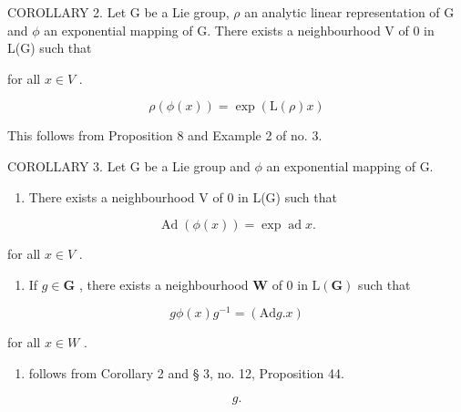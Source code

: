 COROLLARY 2. Let G be a Lie group, \(\rho\) an analytic linear representation of G and \(\phi\) an exponential mapping of G. There exists a neighbourhood V of 0 in L(G) such that

for all \(x \in V\) .

\[
\rho (\phi (x)) = \exp (\mathrm{L} (\rho) x)
\]

This follows from Proposition 8 and Example 2 of no. 3.

COROLLARY 3. Let G be a Lie group and \(\phi\) an exponential mapping of G.

\begin{enumerate}
\def\labelenumi{(\roman{enumi})}
\tightlist
\item
  There exists a neighbourhood V of 0 in L(G) such that
\end{enumerate}

\[
\operatorname{Ad} (\phi (x)) = \exp \operatorname{ad} x.
\]

for all \(x \in V\) .

\begin{enumerate}
\def\labelenumi{(\roman{enumi})}
\setcounter{enumi}{1}
\tightlist
\item
  If \(g \in \mathbf{G}\) , there exists a neighbourhood \(\mathbf{W}\) of 0 in \(\mathrm{L}(\mathbf{G})\) such that
\end{enumerate}

\[
g \phi (x) g ^ {- 1} = (\mathrm{Ad} g. x)
\]

for all \(x \in W\) .

\begin{enumerate}
\def\labelenumi{(\roman{enumi})}
\tightlist
\item
  follows from Corollary 2 and § 3, no. 12, Proposition 44.
\end{enumerate}

\[
g.
\]

